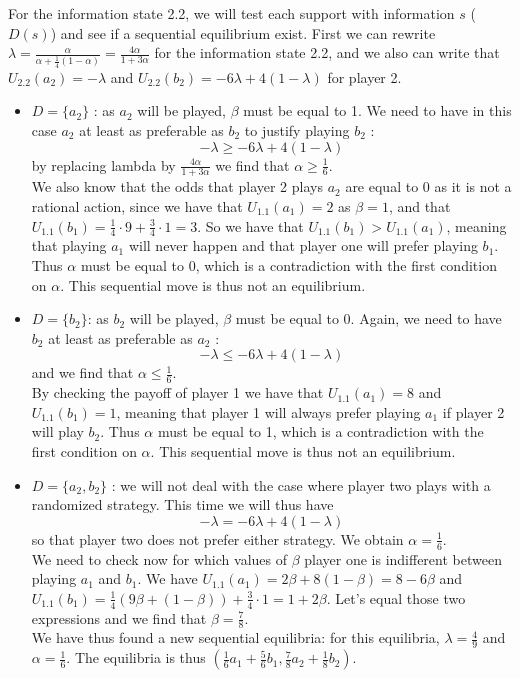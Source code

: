 For the information state 2.2, we will test each support with information $s$ ($D(s)$) and see if a sequential equilibrium exist. First we can rewrite $\lambda = \frac{\alpha}{\alpha + \frac{1}{4} (1-\alpha)} =\frac{4\alpha}{1+3\alpha}$ for the information state 2.2, and we also can write that $U_{2.2} (a_2) = -\lambda$ and $U_{2.2} (b_2) = -6\lambda + 4 (1-\lambda) $ for player 2. 
\begin{itemize}
    \item $D=\{a_2\}$ : as $a_2$ will be played, $\beta$ must be equal to 1. We need to have in this case $a_2$ at least as preferable as $b_2$ to justify playing $b_2$ : $$-\lambda \geq -6\lambda + 4 (1-\lambda)$$ by replacing lambda by $\frac{4\alpha}{1+3\alpha}$ we find that $\alpha \geq \frac{1}{6}$. \\
    We also know that the odds that player 2 plays $a_2$ are equal to 0 as it is not a rational action, since we have that $U_{1.1} (a_1) = 2 $ as $\beta = 1$, and that $U_{1.1} (b_1) = \frac{1}{4} \cdot 9 + \frac{3}{4} \cdot 1 = 3 $. So we have that $U_{1.1} (b_1)>U_{1.1} (a_1)$, meaning that playing $a_1$  will never happen and that player one will prefer playing $b_1$. Thus $\alpha $ must be equal to 0, which is a contradiction with the first condition on $\alpha$. This sequential move is thus not an equilibrium.
    \item $D=\{b_2\}$: as $b_2$ will be played, $\beta$ must be equal to 0. Again, we need to have $b_2$ at least as preferable as $a_2$ : $$-\lambda \leq -6\lambda + 4 (1-\lambda)$$
    and we find that $\alpha \leq \frac{1}{6}$. \\
    By checking the payoff of player 1 we have that $U_{1.1} (a_1) = 8$ and $U_{1.1} (b_1) = 1$, meaning that player 1 will always prefer playing $a_1$ if player 2 will play $b_2$. Thus $\alpha$ must be equal to 1, which is a contradiction with the first condition on $\alpha$. This sequential move is thus not an equilibrium.
    \item $D=\{a_2,b_2\}$ : we will not deal with the case where player two plays with a randomized strategy. This time we will thus have 
    $$-\lambda = -6\lambda + 4 (1-\lambda)$$ so that player two does not prefer either strategy. We obtain $\alpha = \frac{1}{6}$. \\
    We need to check now for which values of $\beta$ player one is indifferent between playing $a_1$ and $b_1$. We have $U_{1.1} (a_1) = 2\beta + 8 (1-\beta) = 8 - 6 \beta $ and $U_{1.1} (b_1) = \frac{1}{4} (9\beta + (1-\beta)) + \frac{3}{4} \cdot 1 = 1 + 2\beta$. Let's equal those two expressions and we find that $\beta = \frac{7}{8}$. \\
    We have thus found a new sequential equilibria: for this equilibria, $\lambda = \frac{4}{9}$ and $\alpha=\frac{1}{6}$. The equilibria is thus $(\frac{1}{6} a_1 + \frac{5}{6} b_1, \frac{7}{8} a_2 +\frac{1}{8} b_2)$.
    
\end{itemize}
